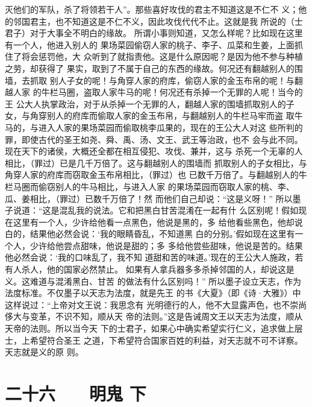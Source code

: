 \documentclass[12pt,UTF8]{ctexbook}
\begin{document}
灭他们的军队，杀了将领若干人”。那些喜好攻伐的君主不知道这是不仁不 
义；他的邻国君主，也不知道这是不仁不义，因此攻伐代代不止。这就是我 
所说的（士君子）对于大事全不明白的缘故。 
所谓小事则知道，又怎么样呢？比如现在这里有一个人，他进入别人的 
果场菜园偷窃人家的桃子、李子、瓜菜和生姜，上面抓住了将会惩罚他，大 
众听到了就指责他。这是什么原因呢？是因为他不参与种植之劳，却获得了 
果实，取到了不属于自己的东西的缘故。何况还有翻越别人的围墙，去抓取 
别人子女的呢！与角穿人家的府库，偷窃人家的金玉布帛的呢！与翻越人家 
的牛栏马圈，盗取人家牛马的呢！何况还有杀掉一个无罪的人呢！当今的王 
公大人执掌政治，对于从杀掉一个无罪的人，翻越人家的围墙抓取别人的子 
女，与角穿别人的府库而偷取人家的金玉布帛，与翻越别人的牛栏马牢而盗 
取牛马的，与进入人家的果场菜园而偷取桃李瓜果的，现在的王公大人对这 
些所判的罪，即使古代的圣王如尧、舜、禹、汤、文王、武王等治政，也不 
会与此不同。现在天下的诸侯，大概还全都在相互侵犯、攻伐、兼并，这与 
杀死一个无辜的人相比，（罪过）已是几千万倍了。这与翻越别人的围墙而 
抓取别人的子女相比，与角穿人家的府库而窃取金玉布帛相比，（罪过）也 
已数千万倍了。与翻越别人的牛栏马圈而偷窃别人的牛马相比，与进入人家 
的果场菜园而窃取人家的桃、李、瓜、姜相比，（罪过）已数千万倍了！然 
而他们自己却说：“这是义呀！” 
所以墨子说道：“这是混乱我的说法。它和把黑白甘苦混淆在一起有什 
么区别呢！假如现在这里有一个人，少许给他看一点黑色，他说是黑的，多 
给他看些黑色，他却说白的，结果他必然会说：‘我的眼睛昏乱，不知道黑 
白的分别。’假如现在这里有一个人，少许给他尝点甜味，他说是甜的；多 
多给他尝些甜味，他说是苦的。结果他必然会说：‘我的口味乱了，我不知 
道甜和苦的味道。’现在的王公大人施政，若有人杀人，他的国家必然禁止。 
如果有人拿兵器多多杀掉邻国的人，却说这是义。这难道与混淆黑白、甘苦 
的做法有什么区别吗！” 
所以墨子设立天志，作为法度标准。不仅墨子以天志为法度，就是先王 
的书《大夏》（即《诗·大雅》）中这样说过：“上帝对文王说：我思念有 
光明德行的人，他不大显露声色，也不崇尚侈大与变革，不识不知，顺从天 
帝的法则。”这是告诫周文王以天志为法度，顺从天帝的法则。所以当今天 
下的士君子，如果心中确实希望实行仁义，追求做上层士，上希望符合圣王 
之道，下希望符合国家百姓的利益，对天志就不可不详察。天志就是义的原 
则。 

\chapter{二十六　　明鬼 下}
\end{document}
